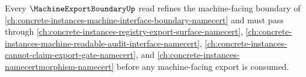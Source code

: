 Every $\MachineExportBoundaryUp$ read refines the machine-facing boundary of \autoref{ch:concrete-instances-machine-interface-boundary-namecert} and must pass through \autoref{ch:concrete-instances-registry-export-surface-namecert}, \autoref{ch:concrete-instances-machine-readable-audit-interface-namecert}, \autoref{ch:concrete-instances-cannot-claim-export-gate-namecert}, and \autoref{ch:concrete-instances-namecertmorphism-namecert} before any machine-facing export is consumed.
